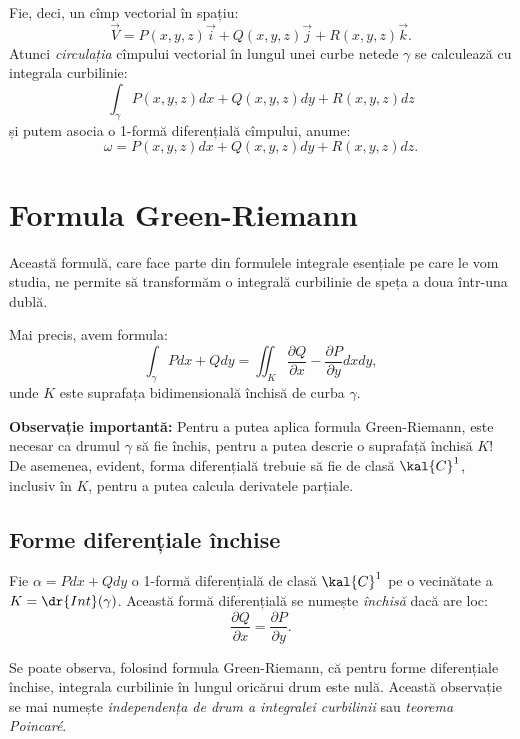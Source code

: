 Fie, deci, un cîmp vectorial în spațiu:
\[
    \vec{V} = P(x, y, z)\vec{i} + Q(x, y, z)\vec{j} + R(x, y, z) \vec{k}.
\]
Atunci \emph{circulația\footnotemark} cîmpului vectorial în lungul unei curbe netede $ \gamma $
se calculează cu integrala curbilinie:
\[
    \int_\gamma P(x, y, z) dx + Q(x, y, z) dy + R(x, y, z) dz
\]
și putem asocia o 1-formă diferențială cîmpului, anume:
\[
    \omega = P(x, y, z) dx + Q(x, y, z)dy + R(x, y, z) dz.
\]


\section{Formula Green-Riemann}

Această formulă, care face parte din formulele integrale esențiale pe care
le vom studia, ne permite să transformăm o integrală curbilinie de speța a doua
într-una dublă.

Mai precis, avem formula:
\[
  \int_\gamma Pdx + Qdy = %
  \iint_K \frac{\partial Q}{\partial x} - \frac{\partial P}{\partial y} dxdy,
\]
unde $ K $ este suprafața bidimensională închisă de curba $ \gamma $.

\textbf{Observație importantă:} Pentru a putea aplica formula Green-Riemann,
este necesar ca drumul $ \gamma $ să fie închis, pentru a putea descrie
o suprafață închisă $ K $! De asemenea, evident, forma diferențială trebuie
să fie de clasă $ \kal{C}^1 $, inclusiv în $ K $, pentru a putea calcula
derivatele parțiale.

\subsection{Forme diferențiale închise}

Fie $ \alpha = Pdx + Qdy $ o 1-formă diferențială de clasă $ \kal{C}^1 $ pe o
vecinătate a $ K = \dr{Int}(\gamma) $. Această formă diferențială se numește
\emph{închisă} dacă are loc:
\[
  \frac{\partial Q}{\partial x} = \frac{\partial P}{\partial y}.
\]

Se poate observa, folosind formula Green-Riemann, că pentru forme diferențiale
închise, integrala curbilinie în lungul oricărui drum este nulă. Această observație
se mai numește \emph{independența de drum a integralei curbilinii} sau
\emph{teorema Poincar\'e}. 


